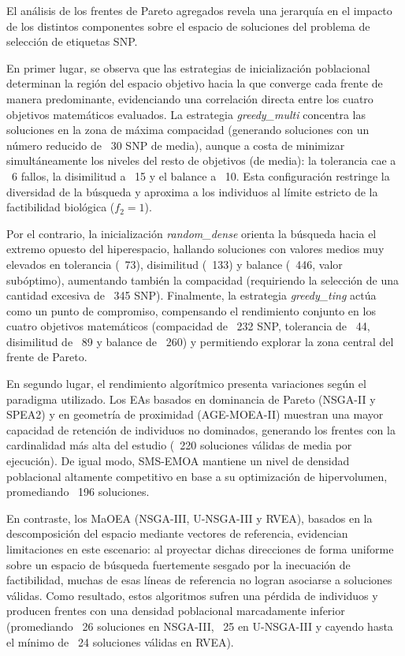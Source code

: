 El análisis de los frentes de Pareto agregados revela una jerarquía en el impacto de los distintos componentes sobre el espacio de soluciones del problema de selección de etiquetas SNP.

En primer lugar, se observa que las estrategias de inicialización poblacional determinan la región del espacio objetivo hacia la que converge cada frente de manera predominante, evidenciando una correlación directa entre los cuatro objetivos matemáticos evaluados. La estrategia \textit{greedy\_multi} concentra las soluciones en la zona de máxima compacidad (generando soluciones con un número reducido de ~30 SNP de media), aunque a costa de minimizar simultáneamente los niveles del resto de objetivos (de media): la tolerancia cae a ~6 fallos, la disimilitud a ~15 y el balance a ~10. Esta configuración restringe la diversidad de la búsqueda y aproxima a los individuos al límite estricto de la factibilidad biológica ($f_2 = 1$).

Por el contrario, la inicialización \textit{random\_dense} orienta la búsqueda hacia el extremo opuesto del hiperespacio, hallando soluciones con valores medios muy elevados en tolerancia (~73), disimilitud (~133) y balance (~446, valor subóptimo), aumentando también la compacidad (requiriendo la selección de una cantidad excesiva de ~345 SNP). Finalmente, la estrategia \textit{greedy\_ting} actúa como un punto de compromiso, compensando el rendimiento conjunto en los cuatro objetivos matemáticos (compacidad de ~232 SNP, tolerancia de ~44, disimilitud de ~89 y balance de ~260) y permitiendo explorar la zona central del frente de Pareto.

En segundo lugar, el rendimiento algorítmico presenta variaciones según el paradigma utilizado. Los EAs basados en dominancia de Pareto (NSGA-II y SPEA2) y en geometría de proximidad (AGE-MOEA-II) muestran una mayor capacidad de retención de individuos no dominados, generando los frentes con la cardinalidad más alta del estudio (~220 soluciones válidas de media por ejecución). De igual modo, SMS-EMOA mantiene un nivel de densidad poblacional altamente competitivo en base a su optimización de hipervolumen, promediando ~196 soluciones.

En contraste, los MaOEA (NSGA-III, U-NSGA-III y RVEA), basados en la descomposición del espacio mediante vectores de referencia, evidencian limitaciones en este escenario: al proyectar dichas direcciones de forma uniforme sobre un espacio de búsqueda fuertemente sesgado por la inecuación de factibilidad, muchas de esas líneas de referencia no logran asociarse a soluciones válidas. Como resultado, estos algoritmos sufren una pérdida de individuos y producen frentes con una densidad poblacional marcadamente inferior (promediando ~26 soluciones en NSGA-III, ~25 en U-NSGA-III y cayendo hasta el mínimo de ~24 soluciones válidas en RVEA).

